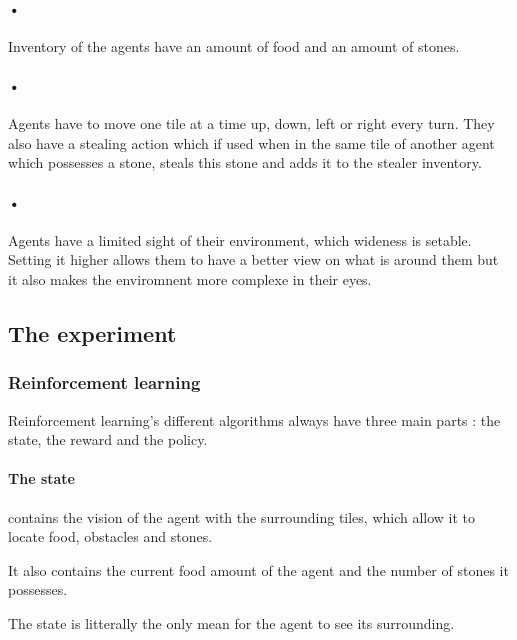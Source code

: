 \documentclass{article}
\begin{document}
\paragraph{•}
Inventory of the agents have an amount of food and an amount of stones.

\paragraph{•}
Agents have to move one tile at a time up, down, left or right every turn. They also have a stealing action which if used when in the same tile of another agent which possesses a stone, steals this stone and adds it to the stealer inventory.

\paragraph{•}
Agents have a limited sight of their environment, which wideness is setable. Setting it higher allows them to have a better view on what is around them but it also makes the enviromnent more complexe in their eyes.

\subsection{The experiment}

\subsubsection{Reinforcement learning}

Reinforcement learning's different algorithms always have three main parts : the state, the reward and the policy.

\paragraph{The state}
contains the vision of the agent with the surrounding tiles, which allow it to locate food, obstacles and stones. \par
It also contains the current food amount of the agent and the number of stones it possesses. \par
The state is litterally the only mean for the agent to see its surrounding.
\end{document}
